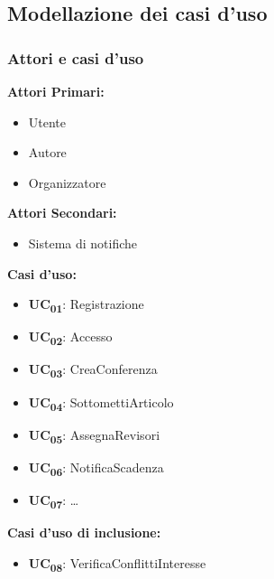 \subsection{Modellazione dei casi d'uso}
\subsubsection{Attori e casi d'uso}
\begin{center}
\begin{minipage}[t]{0.5\textwidth}
\textbf{Attori Primari:}
\begin{itemize}
\item Utente
\item Autore
\item Organizzatore
\end{itemize}  
\end{minipage}%
\begin{minipage}[t]{0.5\textwidth}
\textbf{Attori Secondari:}
\begin{itemize}
\item Sistema di notifiche
\end{itemize}  
\end{minipage}%
\end{center}

\noindent
\textbf{Casi d'uso:}
\begin{itemize}
\item \textbf{UC\textsubscript{01}}: Registrazione
\item \textbf{UC\textsubscript{02}}: Accesso
\item \textbf{UC\textsubscript{03}}: CreaConferenza
\item \textbf{UC\textsubscript{04}}: SottomettiArticolo
\item \textbf{UC\textsubscript{05}}: AssegnaRevisori
\item \textbf{UC\textsubscript{06}}: NotificaScadenza
\item \textbf{UC\textsubscript{07}}: \dots
\end{itemize}

\textbf{Casi d'uso di inclusione:}
\begin{itemize}
\item \textbf{UC\textsubscript{08}}: VerificaConflittiInteresse
\end{itemize}


